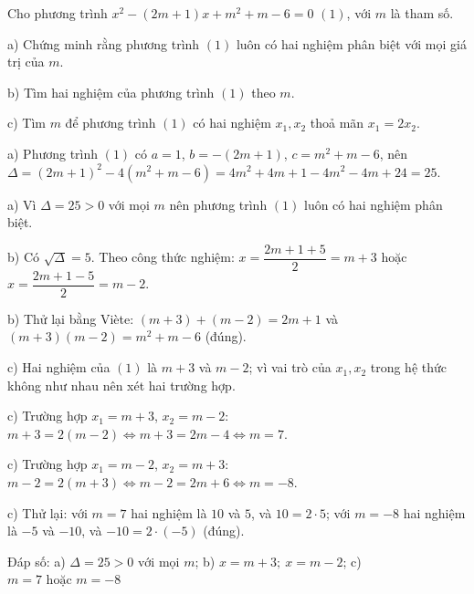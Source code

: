 \begin{problem}[9DS-PT2-046]
Cho phương trình $x^2 - (2m + 1)x + m^2 + m - 6 = 0$ $(1)$, với $m$ là tham số.

a) Chứng minh rằng phương trình $(1)$ luôn có hai nghiệm phân biệt với mọi giá trị của $m$.

b) Tìm hai nghiệm của phương trình $(1)$ theo $m$.

c) Tìm $m$ để phương trình $(1)$ có hai nghiệm $x_1, x_2$ thoả mãn $x_1 = 2x_2$.

\begin{solution}
a) Phương trình $(1)$ có $a = 1$, $b = -(2m + 1)$, $c = m^2 + m - 6$, nên $\Delta = (2m + 1)^2 - 4(m^2 + m - 6) = 4m^2 + 4m + 1 - 4m^2 - 4m + 24 = 25$.

a) Vì $\Delta = 25 > 0$ với mọi $m$ nên phương trình $(1)$ luôn có hai nghiệm phân biệt.

b) Có $\sqrt{\Delta} = 5$. Theo công thức nghiệm: $x = \dfrac{2m + 1 + 5}{2} = m + 3$ hoặc $x = \dfrac{2m + 1 - 5}{2} = m - 2$.

b) Thử lại bằng Viète: $(m + 3) + (m - 2) = 2m + 1$ và $(m + 3)(m - 2) = m^2 + m - 6$ (đúng).

c) Hai nghiệm của $(1)$ là $m + 3$ và $m - 2$; vì vai trò của $x_1, x_2$ trong hệ thức không như nhau nên xét hai trường hợp.

c) Trường hợp $x_1 = m + 3$, $x_2 = m - 2$: $m + 3 = 2(m - 2) \Leftrightarrow m + 3 = 2m - 4 \Leftrightarrow m = 7$.

c) Trường hợp $x_1 = m - 2$, $x_2 = m + 3$: $m - 2 = 2(m + 3) \Leftrightarrow m - 2 = 2m + 6 \Leftrightarrow m = -8$.

c) Thử lại: với $m = 7$ hai nghiệm là $10$ và $5$, và $10 = 2 \cdot 5$; với $m = -8$ hai nghiệm là $-5$ và $-10$, và $-10 = 2 \cdot (-5)$ (đúng).

Đáp số: a) $\boxed{\Delta = 25 > 0 \text{ với mọi } m}$; b) $\boxed{x = m + 3;\ x = m - 2}$; c) $\boxed{m = 7 \text{ hoặc } m = -8}$
\end{solution}
\end{problem}

